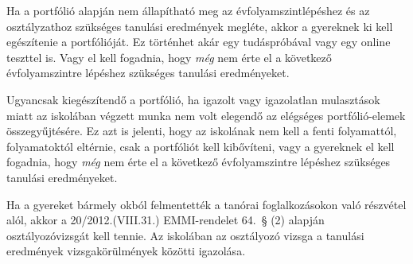 Ha a portfólió alapján nem állapítható meg az évfolyamszintlépéshez és
az osztályzathoz szükséges tanulási eredmények megléte, akkor a
gyereknek ki kell egészítenie a portfólióját. Ez történhet akár egy
tudáspróbával vagy egy online teszttel is. Vagy el kell fogadnia, hogy
\emph{még} nem érte el a következő évfolyamszintre lépéshez szükséges
tanulási eredményeket.

Ugyancsak kiegészítendő a portfólió, ha igazolt vagy igazolatlan
mulasztások miatt az iskolában végzett munka nem volt elegendő az
elégséges portfólió-elemek összegyűjtésére. Ez azt is jelenti, hogy az
iskolának nem kell a fenti folyamattól, folyamatoktól eltérnie, csak a
portfóliót kell kibővíteni, vagy a gyereknek el kell
fogadnia, hogy \emph{még} nem érte el a következő évfolyamszintre
lépéshez szükséges tanulási eredményeket.

Ha a gyereket bármely okból felmentették a tanórai foglalkozásokon való
részvétel alól, akkor a 20/2012.(VIII.31.) EMMI-rendelet 64.~§ (2)
alapján osztályozóvizsgát kell tennie. Az iskolában az osztályozó vizsga
a tanulási eredmények vizsgakörülmények közötti igazolása.
